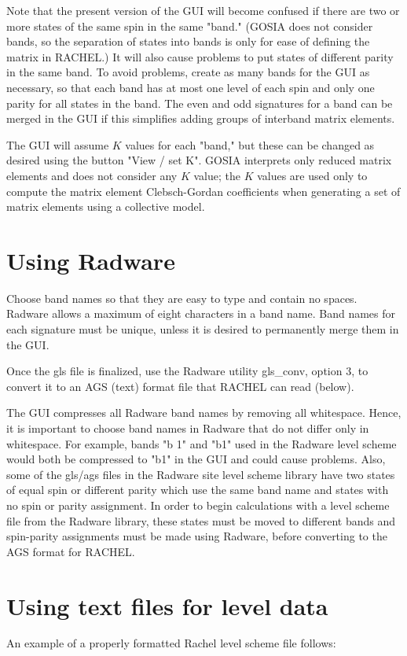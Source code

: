 \documentclass[10pt]{article}
\begin{document}
Note that the present version of the GUI will become confused if there are two or more states of the same spin in the same "band." (GOSIA does not consider bands, so the separation of states into bands is only for ease of defining the matrix in RACHEL.) It will also cause problems to put states of different parity in the same band. To avoid problems, create as many bands for the GUI as necessary, so that each band has at most one level of each spin and only one parity for all states in the band. The even and odd signatures for a band can be merged in the GUI if this simplifies adding groups of interband matrix elements.

The GUI will assume $K$ values for each "band," but these can be changed as desired using the button "View / set K". GOSIA interprets only reduced matrix elements and does not consider any $K$ value; the $K$ values are used only to compute the matrix element Clebsch-Gordan coefficients when generating a set of matrix elements using a collective model.

\section*{Using Radware}
Choose band names so that they are easy to type and contain no spaces. Radware allows a maximum of eight characters in a band name. Band names for each signature must be unique, unless it is desired to permanently merge them in the GUI.

Once the gls file is finalized, use the Radware utility gls\_conv, option 3, to convert it to an AGS (text) format file that RACHEL can read (below).

The GUI compresses all Radware band names by removing all whitespace. Hence, it is important to choose band names in Radware that do not differ only in whitespace. For example, bands "b 1" and "b1" used in the Radware level scheme would both be compressed to "b1" in the GUI and could cause problems. Also, some of the gls/ags files in the Radware site level scheme library have two states of equal spin or different parity which use the same band name and states with no spin or parity assignment. In order to begin calculations with a level scheme file from the Radware library, these states must be moved to different bands and spin-parity assignments must be made using Radware, before converting to the AGS format for RACHEL.

\section*{Using text files for level data}
An example of a properly formatted Rachel level scheme file follows:
\end{document}
